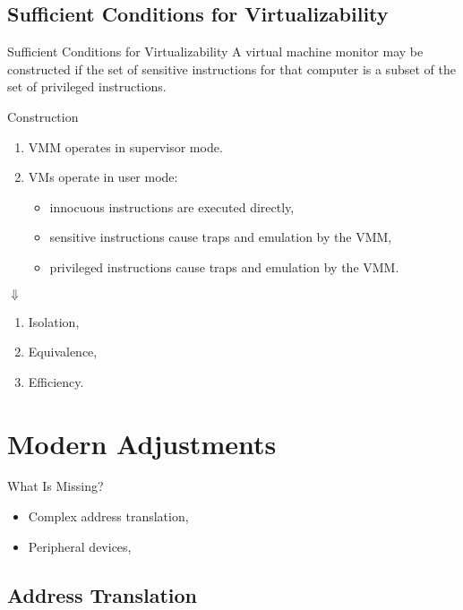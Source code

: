\subsection{Sufficient Conditions for Virtualizability}

\begin{frame}{Sufficient Conditions for Virtualizability}
A virtual machine monitor may be constructed if the set of sensitive
instructions for that computer is a subset of the set of privileged
instructions.
\vfill\centering
{} 
\end{frame}

\begin{frame}{Construction}
\begin{enumerate}
\item VMM operates in supervisor mode.
\item VMs operate in user mode:
  \begin{itemize}
  \item innocuous instructions are executed directly,
  \item sensitive instructions cause traps and emulation by the VMM,
  \item privileged instructions cause traps and emulation by the VMM.
  \end{itemize}
\end{enumerate}
\pause
\centering$\Downarrow$
\begin{enumerate}
  \item Isolation,
  \item Equivalence,
  \item Efficiency.
\end{enumerate}
\end{frame}

\section{Modern Adjustments}

\begin{frame}{What Is Missing?}
\begin{itemize}
  \item Complex address translation,
  \item Peripheral devices,
\end{itemize}
\end{frame}

\subsection{Address Translation}

